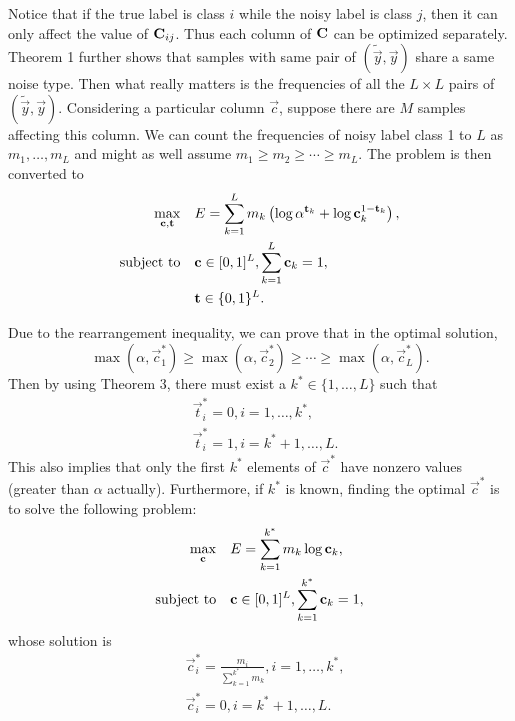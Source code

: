 Notice that if the true label is class $i$ while the noisy label is class $j$, then it can only affect the value of $\mathbf{C}_{ij}$. Thus each column of $\mathbf{C}$ can be optimized separately. Theorem 1 further shows that samples with same pair of $(\tilde{\vec{y}},\vec{y})$ share a same noise type. Then what really matters is the frequencies of all the $L\times L$ pairs of $(\tilde{\vec{y}},\vec{y})$. Considering a particular column $\vec{c}$, suppose there are $M$ samples affecting this column. We can count the frequencies of noisy label class 1 to $L$ as $m_1,\dots,m_L$ and might as well assume $m_1\geq m_2\geq \cdots \geq m_L$. The problem is then converted to
\begin{equation}
\begin{aligned}
\max_{\mathbf{c},\mathbf{t}} \quad & E=\sum_{k=1}^{L} m_k \left(\log \alpha^{\mathbf{t}_k} + \log \mathbf{c}_k^{1-\mathbf{t}_k}\right),\\
\text{subject to} \quad & \mathbf{c} \in [0,1]^L, \sum_{k=1}^{L} \mathbf{c}_k = 1,\\
                    & \mathbf{t} \in \{0,1\}^{L}.
\end{aligned}
\end{equation}

Due to the rearrangement inequality, we can prove that in the optimal solution,
\begin{equation}
    \max(\alpha,\vec{c}^*_1) \geq \max(\alpha,\vec{c}^*_2) \geq \cdots \geq \max(\alpha,\vec{c}^*_L).
\end{equation}
Then by using Theorem 3, there must exist a $k^* \in \{1,\dots,L\}$ such that
\begin{equation} \label{eq:nl-opt-t}
\begin{aligned}
    &\vec{t}^*_i = 0, i = 1,\dots,k^*, \\
    &\vec{t}^*_i = 1, i = k^*+1,\dots,L.
\end{aligned}
\end{equation}
This also implies that only the first $k^*$ elements of $\vec{c}^*$ have nonzero values (greater than $\alpha$ actually). Furthermore, if $k^*$ is known, finding the optimal $\vec{c}^*$ is to solve the following problem:
\begin{equation}
\begin{aligned}
\max_{\mathbf{c}} \quad & E=\sum_{k=1}^{k^*} m_k \log \mathbf{c}_k,\\
\text{subject to} \quad & \mathbf{c} \in [0,1]^L, \sum_{k=1}^{k^*} \mathbf{c}_k = 1,
\end{aligned}
\end{equation}
whose solution is
\begin{equation} \label{eq:nl-opt-c}
\begin{aligned}
    &\vec{c}^*_i = \frac{m_i}{\sum_{k=1}^{k^*}{m_k}}, i = 1,\dots,k^*,\\
    &\vec{c}^*_i = 0, i = k^*+1,\dots,L.
\end{aligned}
\end{equation}

